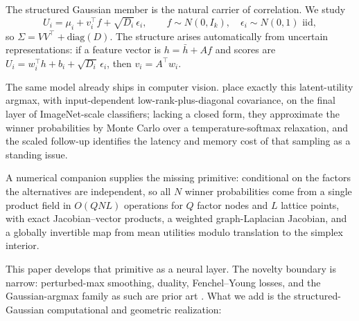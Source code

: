 \documentclass[11pt]{article}
\theoremstyle{remark}
\begin{document}
The structured Gaussian member is the natural carrier of correlation.
We study
\[
U_i = \mu_i + v_i^\top f + \sqrt{D_i}\,\epsilon_i, \qquad
f \sim N(0, I_k), \quad \epsilon_i \sim N(0,1) \text{ iid},
\]
so $\Sigma = VV^\top + \mathrm{diag}(D)$. The structure arises
automatically from uncertain representations: if a feature vector is
$h = \bar h + Af$ and scores are $U_i = w_i^\top h + b_i +
\sqrt{D_i}\,\epsilon_i$, then $v_i = A^\top w_i$.

The same model already ships in computer vision. \citet{collier2021}
place exactly this latent-utility argmax, with input-dependent
low-rank-plus-diagonal covariance, on the final layer of ImageNet-scale
classifiers; lacking a closed form, they approximate the winner
probabilities by Monte Carlo over a temperature-softmax relaxation, and
the scaled follow-up \citep{collier2023} identifies the latency and
memory cost of that sampling as a standing issue.

A numerical companion \citep{cotton2026} supplies the missing
primitive: conditional on the factors the alternatives are independent,
so all $N$ winner probabilities come from a single product field in
$O(QNL)$ operations for $Q$ factor nodes and $L$ lattice points, with
exact Jacobian--vector products, a weighted graph-Laplacian Jacobian,
and a globally invertible map from mean utilities modulo translation to
the simplex interior.

This paper develops that primitive as a neural layer. The novelty
boundary is narrow: perturbed-max smoothing, duality, Fenchel--Young
losses, and the Gaussian-argmax family as such are prior art
\citep{berthet2020,blondel2020,indelman2024,lin2026,fosgerau2020}. What
we add is the structured-Gaussian computational and geometric
realization:
\end{document}

